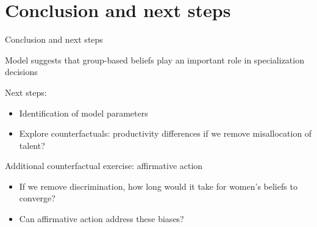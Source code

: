 \documentclass[compress, 8pt]{beamer}
\begin{document}


\miniframesoff
\section[Conclusion]{Conclusion and next steps}
\begin{frame}
    \tableofcontents[currentsection]
\end{frame}
\miniframeson

\begin{frame}{Conclusion and next steps}

Model suggests that group-based beliefs play an important role in specialization decisions

\vspace{4ex}
Next steps:
\begin{itemize}
    \item Identification of model parameters
    \item Explore counterfactuals: productivity differences if we remove misallocation of talent?
\end{itemize}

\vspace{4ex}
Additional counterfactual exercise: affirmative action 
\begin{itemize}
    \item If we remove discrimination, how long would it take for women's beliefs to converge?
    \item Can affirmative action address these biases?
\end{itemize}

\end{frame}



\end{document}
